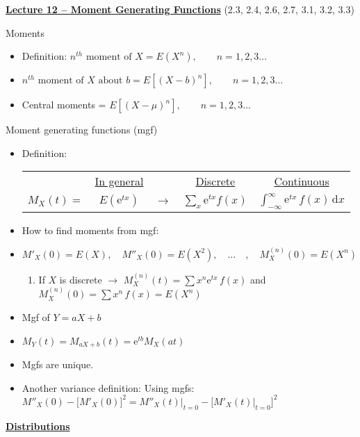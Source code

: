 \documentclass{article}
\newcommand{\bu}[1]{\textbf{\ul{#1}}}				%
\newcommand{\integral}[4]{\int_{#1}^{#2} #3 \,\mathrm{d} #4}		%
\newcommand{\e}{\mathrm{e}}		%
\begin{document}
{\large \bu{Lecture 12 -- Moment Generating Functions}} (2.3, 2.4, 2.6, 2.7, 3.1, 3.2, 3.3)\bigskip

Moments
\begin{itemize}
    \item Definition: $n^{th} \text{ moment of } X = E(X^n), \quad\quad n = 1, 2, 3\ldots$
    \item $n^{th} \text{ moment of } X \text{ about } b = E[(X - b)^n], \quad\quad n = 1, 2, 3\ldots$
    \item Central moments = $E[(X - \mu)^n], \quad\quad n = 1, 2, 3\ldots$
\end{itemize}\bigskip

Moment generating functions (mgf)
\begin{itemize}
    \item Definition:\bigskip\\
    \begin{tabular}{c c c c c}
        & \ul{In general} & & \ul{Discrete} & \ul{Continuous}\\
        $M_X(t) = $ & $E(\e^{tx})$ & $\rightarrow$ & $\displaystyle \sum_x \e^{tx} f(x) $ & $\integral{-\infty}{\infty}{\e^{tx} \, f(x)}{x}$\\
    \end{tabular}\bigskip
    \item How to find moments from mgf:
    \item[] $M'_X(0) = E(X), \quad M''_X(0) = E(X^2), \quad \ldots \quad, \quad M_X^{(n)}(0) = E(X^n)$
    \begin{enumerate}[*]
        \item If $X$ is discrete $\rightarrow$ $M_X^{(n)}(t) = \sum x^n \e^{tx} \, f(x)$ and $M_X^{(n)}(0) = \sum x^n \, f(x) = E(X^n)$
    \end{enumerate}
    \item Mgf of $Y = aX + b$
    \item[] $M_Y(t) = M_{aX + b}(t) = \e^{tb} M_X(at)$
    \item Mgfs are unique.
    \item Another variance definition: Using mgfs: $M''_X(0) - \big[M'_X(0)\big]^2 = M''_X(t)\big\rvert_{t = 0} - \big[M'_X(t)\big\rvert_{t = 0}\big]^2$
\end{itemize}\bigskip




\newpage

{\large \bu{Distributions}}\bigskip
\end{document}
